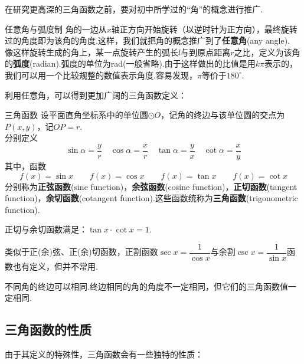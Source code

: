 \documentclass[lang=cn, zihao=4.5]{elegantbook}
\begin{document}
在研究更高深的三角函数之前，要对初中所学过的“角”的概念进行推广.

\begin{definition}{任意角与弧度制} %
    角的一边从$x$轴正方向开始旋转（以逆时针为正方向），最终旋转过的角度即为该角的角度.这样，我们就把角的概念推广到了\textbf{任意角}(any angle).\\
    像这样旋转生成的角上，某一点旋转产生的弧长$l$与到原点距离$r$之比，定义为该角的\textbf{弧度}(radian).弧度的单位为rad(一般省略).由于这样做出的比值是用$k \pi$表示的，我们可以用一个比较规整的数值表示角度.容易发现，$\pi$等价于$180^{\circ}$.
\end{definition}

利用任意角，可以得到更加广阔的三角函数定义：

\begin{definition}{三角函数} %
    设平面直角坐标系中的单位圆$\odot O$，记角的终边与该单位圆的交点为$P(x,y)$，记$OP=r$.\\
    分别定义$$\sin{\alpha}=\frac{y}{r} \quad \cos{\alpha}=\frac{x}{r} \quad \tan{\alpha}=\frac{y}{x} \quad \cot{\alpha}=\frac{x}{y}$$
    其中，函数$$f(x)=\sin{x} \qquad f(x)=\cos{x} \qquad f(x)=\tan{x} \qquad f(x)=\cot{x}$$
    分别称为\textbf{正弦函数}(sine function)，\textbf{余弦函数}(cosine function)，\textbf{正切函数}(tangent function)，\textbf{余切函数}(cotangent function).这些函数统称为\textbf{三角函数}(trigonometric function).
\end{definition}
\begin{remark}
    正切与余切函数满足：$\tan{x} \cdot \cot{x} = 1$.
\end{remark}
\begin{remark}
    类似于正(余)弦、正(余)切函数，正割函数$\sec{x}=\dfrac{1}{\cos{x}}$与余割$\csc{x}=\dfrac{1}{\sin{x}}$函数也有定义，但并不常用.
\end{remark}
\begin{remark}
    不同角的终边可以相同.终边相同的角的角度不一定相同，但它们的三角函数值一定相同.
\end{remark}


\subsection{三角函数的性质}

由于其定义的特殊性，三角函数会有一些独特的性质：
\end{document}

